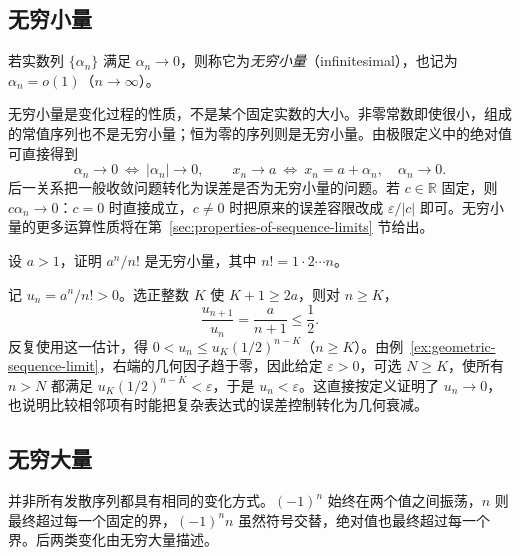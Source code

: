 \documentclass[UTF8,12pt,a4paper,fontset=fandol]{ctexbook}
\begin{document}
\subsection{无穷小量}
\label{subsec:infinitesimal-sequences}

\begin{definition}
\label{def:infinitesimal-sequence}
若实数列 $\{\alpha_n\}$ 满足 $\alpha_n\to0$，则称它为\emph{无穷小量}（infinitesimal），也记为 $\alpha_n=o(1)$（$n\to\infty$）。
\end{definition}

无穷小量是变化过程的性质，不是某个固定实数的大小。非零常数即使很小，组成的常值序列也不是无穷小量；恒为零的序列则是无穷小量。由极限定义中的绝对值可直接得到
\begin{equation}
    \alpha_n\to0\ \Longleftrightarrow\ |\alpha_n|\to0,
    \qquad
    x_n\to a\ \Longleftrightarrow\ x_n=a+\alpha_n,\quad\alpha_n\to0.
    \label{eq:sequence-limit-and-infinitesimal-error}
\end{equation}
后一关系把一般收敛问题转化为误差是否为无穷小量的问题。若 $c\in\mathbb{R}$ 固定，则 $c\alpha_n\to0$：$c=0$ 时直接成立，$c\neq0$ 时把原来的误差容限改成 $\varepsilon/|c|$ 即可。无穷小量的更多运算性质将在第~\ref{sec:properties-of-sequence-limits} 节给出。

\begin{example}
\label{ex:factorial-dominates-geometric-sequence}
设 $a>1$，证明 $a^n/n!$ 是无穷小量，其中 $n!=1\cdot2\cdots n$。
\end{example}

\begin{solve}
记 $u_n=a^n/n!>0$。选正整数 $K$ 使 $K+1\geq2a$，则对 $n\geq K$，
\[
    \frac{u_{n+1}}{u_n}=\frac{a}{n+1}\leq\frac12.
\]
反复使用这一估计，得 $0<u_n\leq u_K(1/2)^{n-K}$（$n\geq K$）。由例~\ref{ex:geometric-sequence-limit}，右端的几何因子趋于零，因此给定 $\varepsilon>0$，可选 $N\geq K$，使所有 $n>N$ 都满足 $u_K(1/2)^{n-K}<\varepsilon$，于是 $u_n<\varepsilon$。这直接按定义证明了 $u_n\to0$，也说明比较相邻项有时能把复杂表达式的误差控制转化为几何衰减。
\end{solve}

\subsection{无穷大量}
\label{subsec:infinite-sequences}

并非所有发散序列都具有相同的变化方式。$(-1)^n$ 始终在两个值之间振荡，$n$ 则最终超过每一个固定的界，$(-1)^n n$ 虽然符号交替，绝对值也最终超过每一个界。后两类变化由无穷大量描述。
\end{document}
